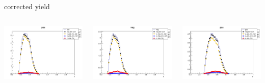 \begin{frame}{corrected yield}
\begin{columns}
\begin{column}[T]{0.25\textwidth}
\includegraphics[width = \textwidth]{results/yield/statistics_corr/yield_x_Q2_z_0.60_5.500_0.45_pos.png}
\end{column}
\begin{column}[T]{0.25\textwidth}
\includegraphics[width = \textwidth]{results/yield/statistics_corr/yield_x_Q2_z_0.60_5.500_0.45_neg.png}
\end{column}
\begin{column}[T]{0.25\textwidth}
\includegraphics[width = \textwidth]{results/yield/statistics_corr/yield_x_Q2_z_0.60_5.500_0.55_pos.png}

\end{column}
\end{columns}
\end{frame}
